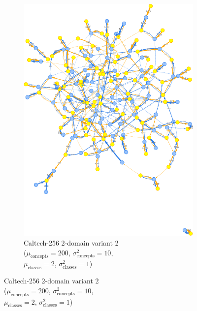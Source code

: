 \begin{figure}[H]
\begin{subfigure}[b]{0.35\textwidth}
            \includegraphics[width=\textwidth]{figures/caltech256_2domain_variant.png}
            \caption{Caltech-256 2-domain variant 2\\
            ($\mu_{\text{concepts}}=200$, $\sigma^2_{\text{concepts}}=10$,\\
            $\mu_{\text{classes}}=2$, $\sigma^2_{\text{classes}}=1$)}
            \label{fig:caltech256_2domain_variant}
      \end{subfigure}


\end{figure}
